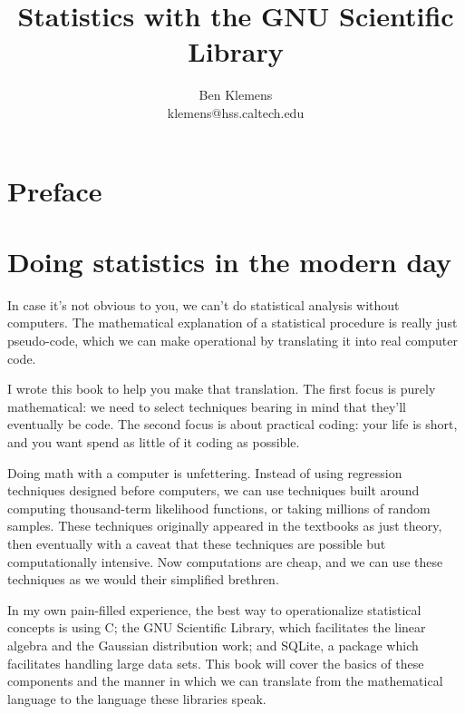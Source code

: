 \documentclass[12pt,notitlepage, openany]{book}
\begin{document}
\setlength{\textwidth}{6.5in}
\setlength{\textheight}{9in} 
\title{Statistics with the GNU Scientific Library}
\author{Ben Klemens\\klemens@hss.caltech.edu}
\maketitle

\chapter*{Preface}


\tableofcontents \vfill\eject

\chapter{Doing statistics in the modern day}

In case it's not obvious to you, we can't do statistical analysis without
computers.  The mathematical explanation of a statistical procedure is
really just pseudo-code, which we can make operational by translating
it into real computer code.

I wrote this book to help you make that translation. The first focus is purely
mathematical: we need to select techniques bearing in mind that they'll eventually
be code. The second focus is about practical coding: your life
is short, and you want spend as little of it coding as possible.

Doing math with a computer is unfettering. Instead of using
regression techniques designed before computers, we can use techniques
built around computing thousand-term likelihood functions, or taking
millions of random samples. These techniques originally appeared in the textbooks as
just theory, then eventually with a caveat that these techniques are possible but
computationally intensive. Now computations are cheap, and we can 
use these techniques as we would their simplified brethren.

In my own pain-filled experience, the best way to operationalize statistical concepts
is using C; the GNU Scientific Library,  which facilitates the linear
algebra and the Gaussian distribution work; and SQLite, a package which
facilitates handling large data sets. This book will cover the basics
of these components and the manner in which we can translate from the
mathematical language to the language these libraries speak.
\end{document}
